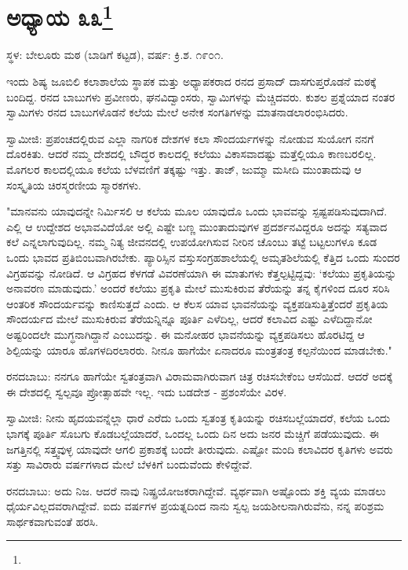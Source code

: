 \newpage

\chapter[ಅಧ್ಯಾಯ ೩೩]{ಅಧ್ಯಾಯ ೩೩\protect\footnote{}}

\centerline{ಸ್ಥಳ: ಬೇಲೂರು ಮಠ (ಬಾಡಿಗೆ ಕಟ್ಟಡ), ವರ್ಷ: ಕ್ರಿ.ಶ. ೧೯೦೧.}

ಇಂದು ಶಿಷ್ಯ ಜೂಬಿಲಿ ಕಲಾಶಾಲೆಯ ಸ್ಥಾಪಕ ಮತ್ತು ಅಧ್ಯಾಪಕರಾದ ರನದ ಪ್ರಸಾದ್ ದಾಸಗುಪ್ತರೊಡನೆ ಮಠಕ್ಕೆ ಬಂದಿದ್ದ. ರನದ ಬಾಬುಗಳು ಪ್ರವೀಣರು, ಘನವಿದ್ವಾಂಸರು, ಸ್ವಾಮಿಗಳನ್ನು ಮೆಚ್ಚಿದವರು. ಕುಶಲ ಪ್ರಶ್ನೆಯಾದ ನಂತರ ಸ್ವಾಮಿಗಳು ರನದ ಬಾಬುಗಳೊಡನೆ ಕಲೆಯ ಮೇಲೆ ಅನೇಕ ಸಂಗತಿಗಳನ್ನು ಮಾತನಾಡಲಾರಂಭಿಸಿದರು.

ಸ್ವಾಮೀಜಿ: ಪ್ರಪಂಚದಲ್ಲಿರುವ ಎಲ್ಲಾ ನಾಗರಿಕ ದೇಶಗಳ ಕಲಾ ಸೌಂದರ್ಯಗಳನ್ನು ನೋಡುವ ಸುಯೋಗ ನನಗೆ ದೊರಕಿತು. ಆದರೆ ನಮ್ಮ ದೇಶದಲ್ಲಿ ಬೌದ್ಧರ ಕಾಲದಲ್ಲಿ ಕಲೆಯು ವಿಕಾಸವಾದಷ್ಟು ಮತ್ತೆಲ್ಲಿಯೂ ಕಾಣಬರಲಿಲ್ಲ. ಮೊಗಲರ ಕಾಲದಲ್ಲಿಯೂ ಕಲೆಯ ಬೆಳವಣಿಗೆ ತಕ್ಕಷ್ಟು ಇತ್ತು. ತಾಜ್, ಜುಮ್ಮಾ ಮಸೀದಿ ಮುಂತಾದುವು ಆ ಸಂಸ್ಕೃತಿಯ ಚಿರಸ್ಮರಣೀಯ ಸ್ಮಾರಕಗಳು.

"ಮಾನವನು ಯಾವುದನ್ನೇ ನಿರ್ಮಿಸಲಿ ಆ ಕಲೆಯ ಮೂಲ ಯಾವುದೊ ಒಂದು ಭಾವವನ್ನು ಸ್ಪಷ್ಟಪಡಿಸುವುದಾಗಿದೆ. ಎಲ್ಲಿ ಆ ಉದ್ದೇಶದ ಅಭಾವವಿದೆಯೋ ಅಲ್ಲಿ ಎಷ್ಟೇ ಬಣ್ಣ ಮುಂತಾದುವುಗಳ ಪ್ರದರ್ಶನವಿದ್ದರೂ ಅದನ್ನು ಸತ್ಯವಾದ ಕಲೆ ಎನ್ನಲಾಗುವುದಿಲ್ಲ. ನಮ್ಮ ನಿತ್ಯ ಜೀವನದಲ್ಲಿ ಉಪಯೋಗಿಸುವ ನೀರಿನ ಚೊಂಬು ತಟ್ಟೆ ಬಟ್ಟಲುಗಳೂ ಕೂಡ ಒಂದು ಭಾವದ ಪ್ರತಿಬಿಂಬವಾಗಿರಬೇಕು. ಪ್ಯಾರಿಸ್ಸಿನ ವಸ್ತುಸಂಗ್ರಹಶಾಲೆಯಲ್ಲಿ ಅಮೃತಶಿಲೆಯಲ್ಲಿ ಕೆತ್ತಿದ ಒಂದು ಸುಂದರ ವಿಗ್ರಹವನ್ನು ನೋಡಿದೆ. ಆ ವಿಗ್ರಹದ ಕೆಳಗಡೆ ವಿವರಣೆಯಾಗಿ ಈ ಮಾತುಗಳು ಕೆತ್ತಲ್ಪಟ್ಟಿದ್ದವು: ‘ಕಲೆಯು ಪ್ರಕೃತಿಯನ್ನು ಅನಾವರಣ ಮಾಡುವುದು.’ ಅಂದರೆ ಕಲೆಯು ಪ್ರಕೃತಿ ಮೇಲೆ ಮುಸುಕಿರುವ ತೆರೆಯನ್ನು ತನ್ನ ಕೈಗಳಿಂದ ದೂರ ಸರಿಸಿ ಆಂತರಿಕ ಸೌಂದರ್ಯವನ್ನು ಕಾಣಿಸುತ್ತದೆ ಎಂದು. ಆ ಕೆಲಸ ಯಾವ ಭಾವನೆಯನ್ನು ವ್ಯಕ್ತಪಡಿಸುತ್ತಿತ್ತೆಂದರೆ ಪ್ರಕೃತಿಯ ಸೌಂದರ್ಯದ ಮೇಲೆ ಮುಸುಕಿರುವ ತೆರೆಯನ್ನಿನ್ನೂ ಪೂರ್ತಿ ಎಳೆದಿಲ್ಲ, ಆದರೆ ಕಲಾವಿದ ಎಷ್ಟು ಎಳೆದಿದ್ದಾನೋ ಅಷ್ಟರಿಂದಲೇ ಮುಗ್ಧನಾಗಿದ್ದಾನೆ ಎಂಬುದನ್ನು. ಈ ಮನೋಹರ ಭಾವನೆಯನ್ನು ವ್ಯಕ್ತಪಡಿಸಲು ಹೊರಟಿದ್ದ ಆ ಶಿಲ್ಪಿಯನ್ನು ಯಾರೂ ಹೊಗಳದಿರಲಾರರು. ನೀನೂ ಹಾಗೆಯೇ ಏನಾದರೂ ಮಂತ್ರತಂತ್ರ ಕಲ್ಪನೆಯಿಂದ ಮಾಡಬೇಕು."

ರನದಬಾಬು: ನನಗೂ ಹಾಗೆಯೇ ಸ್ವತಂತ್ರವಾಗಿ ವಿರಾಮವಾಗಿರುವಾಗ ಚಿತ್ರ ರಚಿಸಬೇಕೆಂಬ ಆಸೆಯಿದೆ. ಆದರೆ ಅದಕ್ಕೆ ಈ ದೇಶದಲ್ಲಿ ಸ್ವಲ್ಪವೂ ಪ್ರೋತ್ಸಾಹವೇ ಇಲ್ಲ. ಇದು ಬಡದೇಶ - ಪ್ರಶಂಸೆಯೇ ವಿರಳ.

ಸ್ವಾಮೀಜಿ: ನೀನು ಹೃದಯವನ್ನೆಲ್ಲಾ ಧಾರೆ ಎರೆದು ಒಂದು ಸ್ವತಂತ್ರ ಕೃತಿಯನ್ನು ರಚಿಸಬಲ್ಲೆಯಾದರೆ, ಕಲೆಯ ಒಂದು ಭಾಗಕ್ಕೆ ಪೂರ್ತಿ ಸೊಬಗು ಕೊಡಬಲ್ಲೆಯಾದರೆ, ಒಂದಲ್ಲ ಒಂದು ದಿನ ಅದು ಜನರ ಮೆಚ್ಚಿಗೆ ಪಡೆಯುವುದು. ಈ ಜಗತ್ತಿನಲ್ಲಿ ಸತ್ತ್ವವುಳ್ಳ ಯಾವುದೇ ಆಗಲಿ ಪ್ರಕಾಶಕ್ಕೆ ಬಂದೇ ತೀರುವುದು. ಎಷ್ಟೋ ಮಂದಿ ಕಲಾವಿದರ ಕೃತಿಗಳು ಅವರು ಸತ್ತು ಸಾವಿರಾರು ವರ್ಷಗಳಾದ ಮೇಲೆ ಬೆಳಕಿಗೆ ಬಂದುವೆಂದು ಕೇಳಿದ್ದೇವೆ.

ರನದಬಾಬು: ಅದು ನಿಜ. ಆದರೆ ನಾವು ನಿಷ್ಪ್ರಯೋಜಕರಾಗಿದ್ದೇವೆ. ವ್ಯರ್ಥವಾಗಿ ಅಷ್ಟೊಂದು ಶಕ್ತಿ ವ್ಯಯ ಮಾಡಲು ಧೈರ್ಯವಿಲ್ಲದವರಾಗಿದ್ದೇವೆ. ಐದು ವರ್ಷಗಳ ಪ್ರಯತ್ನದಿಂದ ನಾನು ಸ್ವಲ್ಪ ಜಯಶೀಲನಾಗಿರುವೆನು, ನನ್ನ ಪರಿಶ್ರಮ ಸಾರ್ಥಕವಾಗುವಂತೆ ಹರಸಿ.


